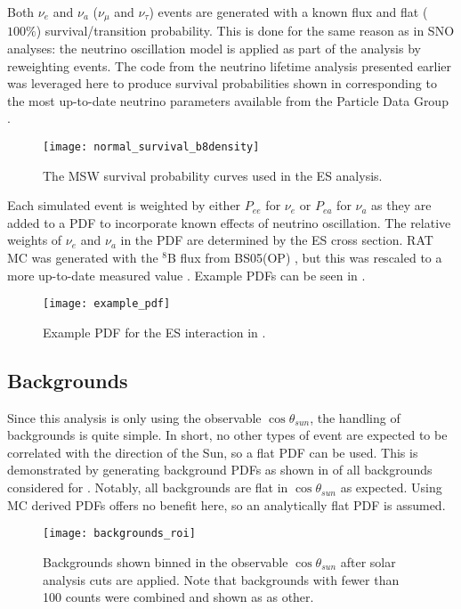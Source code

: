 Both $\nu_e$ and $\nu_a$ ($\nu_\mu$ and $\nu_\tau$) events are generated with a known flux and flat ($100\%$) survival/transition probability.
This is done for the same reason as in SNO analyses: the neutrino oscillation model is applied as part of the analysis by reweighting events.
The code from the neutrino lifetime analysis presented earlier was leveraged here to produce survival probabilities shown in  corresponding to the most up-to-date neutrino parameters available from the Particle Data Group \cite{pdg}.

\begin{figure}
\centering
\texttt{[image: normal\_survival\_b8density]}
\caption{The MSW survival probability curves used in the {\snop} ES analysis.}
\label{fig:solar:msw}
\end{figure}

Each simulated event is weighted by either $P_{ee}$ for $\nu_e$ or $P_{ea}$ for $\nu_a$ as they are added to a PDF to incorporate known effects of neutrino oscillation.
The relative weights of $\nu_e$ and $\nu_a$ in the PDF are determined by the ES cross section.
RAT MC was generated with the $^8$B flux from BS05(OP) \cite{bs05op}, but this was rescaled to a more up-to-date measured value \cite{GlobalSolarFlux}.
Example PDFs can be seen in .

\begin{figure}
\centering
\texttt{[image: example\_pdf]}
\caption{Example PDF for the ES interaction in {\snop}.}
\label{fig:solar:pdfs}
\end{figure}

\subsection{Backgrounds}

Since this analysis is only using the observable $\cos{\theta_{sun}}$, the handling of backgrounds is quite simple.
In short, no other types of event are expected to be correlated with the direction of the Sun, so a flat PDF can be used.
This is demonstrated by generating background PDFs as shown in  of all backgrounds considered for {\snop}.
Notably, all backgrounds are flat in $\cos{\theta_{sun}}$ as expected.
Using MC derived PDFs offers no benefit here, so an analytically flat PDF is assumed.

\begin{figure}
\centering
\texttt{[image: backgrounds\_roi]}
\caption{Backgrounds shown binned in the observable $\cos{\theta_{sun}}$ after solar analysis cuts are applied.
Note that backgrounds with fewer than 100 counts were combined and shown as as other.}
\label{fig:solar:backgrounds}
\end{figure}

